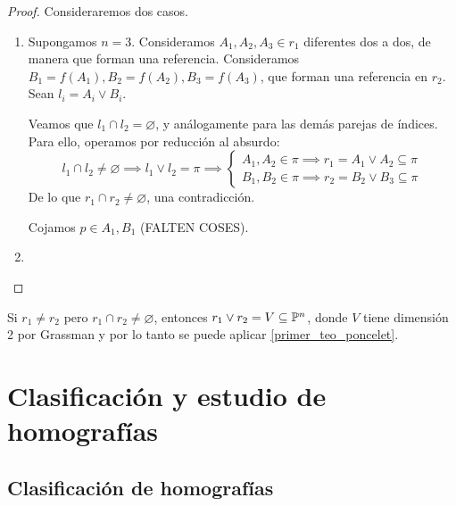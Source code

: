 \begin{proof} %
    Consideraremos dos casos.
    \begin{enumerate}
        \item Supongamos $n = 3$. Consideramos $A_1, A_2, A_3 \in
        r_1$ diferentes dos a dos, de manera que forman una
        referencia. Consideramos $B_1 = f(A_1), B_2 = f(A_2),
        B_3 = f(A_3)$, que forman una referencia en $r_2$.
        Sean $l_i = A_i \vee B_i$.
        
        Veamos que $l_1 \cap l_2 = \varnothing$, y análogamente
        para las demás parejas de índices. Para ello, operamos
        por reducción al absurdo:
        \[
        l_1 \cap l_2 \neq \varnothing \implies l_1 \vee l_2 = \pi
        \implies
        \begin{cases}
        A_1, A_2 \in \pi \implies r_1 = A_1 \vee A_2 \subseteq \pi\\
        B_1, B_2 \in \pi \implies r_2 = B_2 \vee B_3 \subseteq \pi
        \end{cases}
        \]
        De lo que $r_1 \cap r_2 \neq \varnothing$,
        una contradicción.
        
        Cojamos $p \in A_1, B_1$ (FALTEN COSES).
        \item
    \end{enumerate}
\end{proof}

\begin{obs}
    Si $r_1 \neq r_2$ pero $r_1 \cap r_2 \neq \varnothing$, entonces
    $r_1 \vee r_2 = V \subseteq \mathbb{P}^n$, donde $V$ tiene dimensión
    2 por Grassman y por lo tanto se puede 
    aplicar \ref{primer_teo_poncelet}.
\end{obs}

\section{Clasificación y estudio de homografías}

\subsection{Clasificación de homografías}

